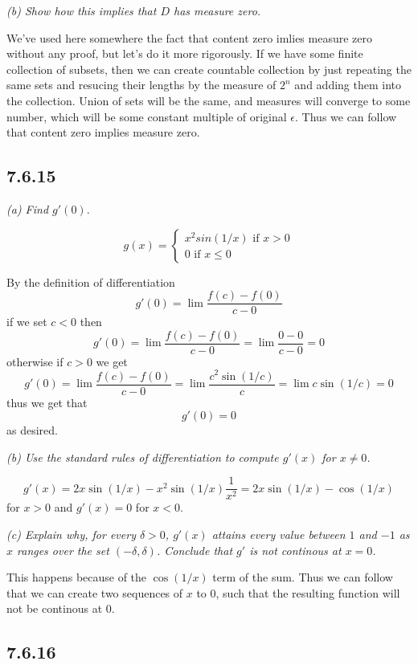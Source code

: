 \documentclass[11pt,oneside,titlepage]{book}
\begin{document}
\textit{(b) Show how this implies that $D$ has measure zero.}

We've used here somewhere the fact that content zero imlies measure zero
without any proof, but let's do it more rigorously. If we have some finite
collection of subsets, then we can create countable collection by just
repeating the same sets and resucing their lengths by the measure of $2^n$ and
adding them into the collection. Union of sets will be the same, and measures
will converge to some number, which will be some constant multiple of
original $\epsilon$. Thus we can follow that content zero implies
measure zero.


\subsection*{7.6.15}

\textit{(a) Find $g'(0)$.}

$$
g(x) =
\begin{cases}
  x^2 sin(1/x) \text{ if } x > 0 \\
  0 \text{ if } x \leq 0
\end{cases}
$$

By the definition of differentiation
$$g'(0) = \lim \frac{f(c) - f(0)}{c - 0}$$
if we set $c < 0$ then
$$g'(0) = \lim \frac{f(c) - f(0)}{c - 0} = \lim \frac{0 - 0}{c - 0} = 0$$
otherwise if $c > 0$ we get
$$g'(0) = \lim {\frac{f(c) - f(0)}{c - 0}} =
\lim {\frac{c^2 \sin (1/c)}{c}} = \lim {c \sin (1/c)} = 0$$
thus we get that
$$g'(0) = 0$$
as desired.

\textit{(b) Use the standard rules of differentiation to compute $g'(x)$ for
  $x \neq 0$.}

$$g'(x) = 2x \sin(1/x) - x^2 \sin(1/x) \frac{1}{x^2} =
2x \sin(1/x) - \cos(1/x) $$
for $x > 0$ and $g'(x) = 0$ for $x < 0$.

\textit{(c) Explain why, for every $\delta > 0$, $g'(x)$ attains every value
  between $1$ and $-1$ as $x$ ranges over the set $(-\delta, \delta)$. Conclude
  that $g'$ is not continous at $x = 0$.}

This happens because of the $\cos(1/x)$ term of the sum. Thus we can follow
that we can create two sequences of $x$ to $0$, such that the resulting
function will not be continous at $0$.

\subsection*{7.6.16}
\end{document}
